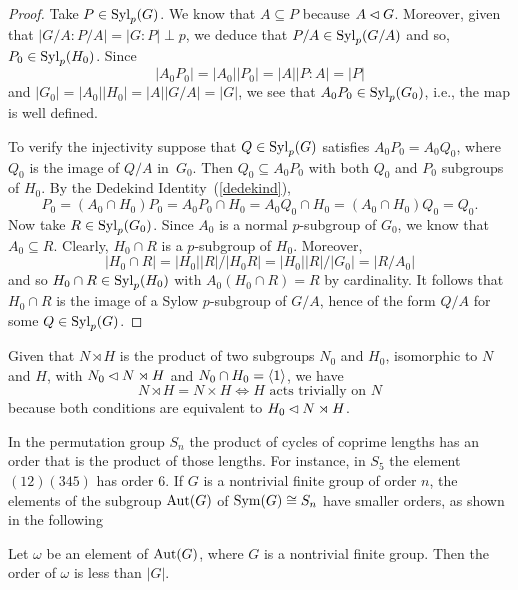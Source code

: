 \begin{proof} Take $P\in{\rm Syl}_p(G)$. We know that $A\subseteq P$ because $A\lhd G$. Moreover, given that $|G/A:P/A|=|G:P|\perp p$, we deduce that $P/A\in{\rm Syl}_p(G/A)$ and so, $P_0\in{\rm Syl}_p(H_0)$. Since
$$
    |A_0P_0|=|A_0||P_0|=|A||P:A|=|P|
$$
and $|G_0|=|A_0||H_0|=|A||G/A|=|G|$, we see that $A_0P_0\in{\rm Syl}_p(G_0)$, i.e., the map is well defined.

To verify the injectivity suppose that $Q\in{\rm Syl}_p(G)$ satisfies $A_0P_0=A_0Q_0$, where $Q_0$ is the image of $Q/A$ in~$G_0$. Then $Q_0\subseteq A_0P_0$ with both $Q_0$ and $P_0$ subgroups of $H_0$. By the Dedekind Identity~(\ref{dedekind}),
$$
    P_0=(A_0\cap H_0)P_0=A_0P_0\cap H_0=A_0Q_0\cap H_0=(A_0\cap H_0)Q_0=Q_0.
$$
Now take $R\in{\rm Syl}_p(G_0)$. Since $A_0$ is a normal $p$-subgroup of $G_0$, we know that $A_0\subseteq R$. Clearly, $H_0\cap R$ is a $p$-subgroup of $H_0$. Moreover,
$$
    |H_0\cap R|=|H_0||R|/|H_0R| = |H_0||R|/|G_0| = |R/A_0|
$$
and so $H_0\cap R\in{\rm Syl}_p(H_0)$ with $A_0(H_0\cap R)=R$ by cardinality. It follows that $H_0\cap R$ is the image of a Sylow $p$-subgroup of $G/A$, hence of the form $Q/A$ for some $Q\in{\rm Syl}_p(G)$.  \end{proof}

\begin{rem}\label{semidirect-is-direct}
    Given that\/ $N\rtimes H$ is the product of two subgroups\/ $N_0$ and\/ $H_0$, isomorphic to\/ $N$ and\/ $H$, with\/ $N_0\lhd N\rtimes H$ and\/ $N_0\cap H_0=\langle1\rangle$, we have
    $$
        N\rtimes H=N\times H \iff H \text{ acts trivially on }N
    $$
    because both conditions are equivalent to $H_0\lhd N\rtimes H$.
\end{rem}

\begin{rem}
    In the permutation group $S_n$ the product of cycles of coprime lengths has an order that is the product of those lengths. For instance, in $S_5$ the element $(12)(345)$ has order $6$. If $G$ is a nontrivial finite group of order $n$, the elements of the subgroup ${\rm Aut}(G)$ of ${\rm Sym}(G)\cong S_n$ have smaller orders, as shown in the following
\end{rem}

\begin{cor}\label{horosevskii}
    {\upshape[Horosevskii]} Let\/ $\omega$ be an element of\/ ${\rm Aut}(G)$, where\/ $G$ is a nontrivial finite group. Then the order of\/ $\omega$ is less than\/ $|G|$.
\end{cor}


